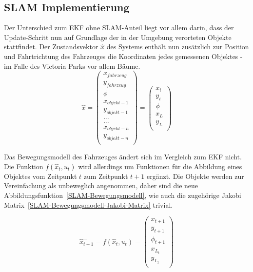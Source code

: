 \documentclass[11pt]{article}
\begin{document}
\subsection{SLAM Implementierung}
Der Unterschied zum EKF ohne SLAM-Anteil liegt vor allem darin, dass der Update-Schritt nun auf Grundlage der in der Umgebung verorteten Objekte stattfindet. Der Zustandsvektor $\hat{x}$ des Systems enthält nun zusätzlich zur Position und Fahrtrichtung des Fahrzeuges die Koordinaten jedes gemessenen Objektes - im Falle des Victoria Parks vor allem Bäume. 
\begin{equation}\label{SLAM-State-Vector}
	\hat{x} = \begin{pmatrix}
		x_{fahrzeug} \\
		y_{fahrzeug} \\
		\phi \\
		x_{objekt-1} \\
		y_{objekt-1} \\
		... \\
		... \\
		x_{objekt-n} \\
		y_{objekt-n} \\
	  \end{pmatrix} = \begin{pmatrix}
		  x_i \\
		  y_i \\
		  \phi \\
		  x_L \\
		  y_L \\
	  \end{pmatrix}
\end{equation}

Das Bewegungsmodell des Fahrzeuges ändert sich im Vergleich zum EKF nicht. Die Funktion $f(\hat{x}_t, u_t)$ wird allerdings um Funktionen für die Abbildung eines Objektes vom Zeitpunkt $t$ zum Zeitpunkt $t+1$ ergänzt. Die Objekte werden zur Vereinfachung als unbeweglich angenommen, daher sind die neue Abbildungsfunktion~\ref{SLAM-Bewegungsmodell}, wie auch die zugehörige Jakobi Matrix~\ref{SLAM-Bewegungsmodell-Jakobi-Matrix} trivial.

\begin{equation}\label{SLAM-Bewegungsmodell}
	\hat{x}_{t+1}^- = f(\hat{x}_{t},u_t) = \begin{pmatrix}
		x_{t+1} \\
		y_{t+1} \\
		\phi_{t+1} \\
		x_{L_t} \\
		y_{L_t} \\
	\end{pmatrix}
\end{equation}
\end{document}
